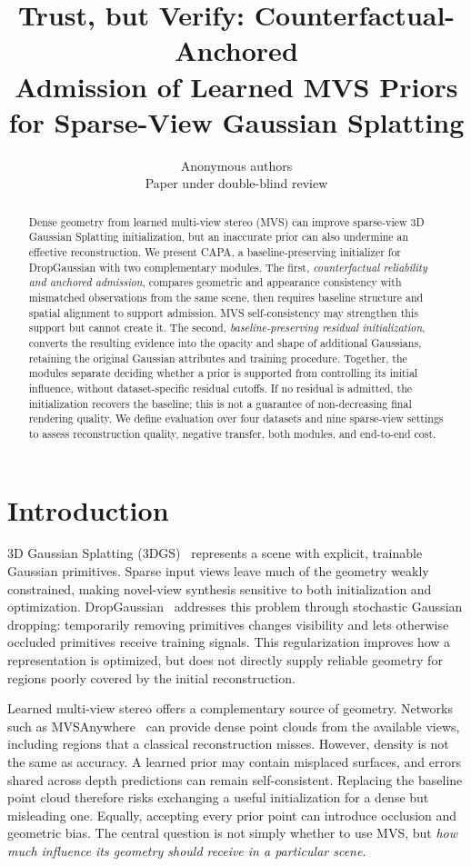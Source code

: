 \documentclass{article}
\title{Trust, but Verify: Counterfactual-Anchored\\
Admission of Learned MVS Priors\\
for Sparse-View Gaussian Splatting}
\author{Anonymous authors\\Paper under double-blind review}
\newcommand{\ours}{CAPA}
\begin{document}
\maketitle

\begin{abstract}
Dense geometry from learned multi-view stereo (MVS) can improve sparse-view 3D Gaussian Splatting initialization, but an inaccurate prior can also undermine an effective reconstruction. We present \ours{}, a baseline-preserving initializer for DropGaussian with two complementary modules. The first, \emph{counterfactual reliability and anchored admission}, compares geometric and appearance consistency with mismatched observations from the same scene, then requires baseline structure and spatial alignment to support admission. MVS self-consistency may strengthen this support but cannot create it. The second, \emph{baseline-preserving residual initialization}, converts the resulting evidence into the opacity and shape of additional Gaussians, retaining the original Gaussian attributes and training procedure. Together, the modules separate deciding whether a prior is supported from controlling its initial influence, without dataset-specific residual cutoffs. If no residual is admitted, the initialization recovers the baseline; this is not a guarantee of non-decreasing final rendering quality. We define evaluation over four datasets and nine sparse-view settings to assess reconstruction quality, negative transfer, both modules, and end-to-end cost.
\end{abstract}

\section{Introduction}
\label{sec:intro}

3D Gaussian Splatting (3DGS)~\citep{kerbl20233d} represents a scene with explicit, trainable Gaussian primitives. Sparse input views leave much of the geometry weakly constrained, making novel-view synthesis sensitive to both initialization and optimization. DropGaussian~\citep{park2025dropgaussian} addresses this problem through stochastic Gaussian dropping: temporarily removing primitives changes visibility and lets otherwise occluded primitives receive training signals. This regularization improves how a representation is optimized, but does not directly supply reliable geometry for regions poorly covered by the initial reconstruction.

Learned multi-view stereo offers a complementary source of geometry. Networks such as MVSAnywhere~\citep{izquierdo2025mvsanywhere} can provide dense point clouds from the available views, including regions that a classical reconstruction misses. However, density is not the same as accuracy. A learned prior may contain misplaced surfaces, and errors shared across depth predictions can remain self-consistent. Replacing the baseline point cloud therefore risks exchanging a useful initialization for a dense but misleading one. Equally, accepting every prior point can introduce occlusion and geometric bias. The central question is not simply whether to use MVS, but \emph{how much influence its geometry should receive in a particular scene}.
\end{document}
